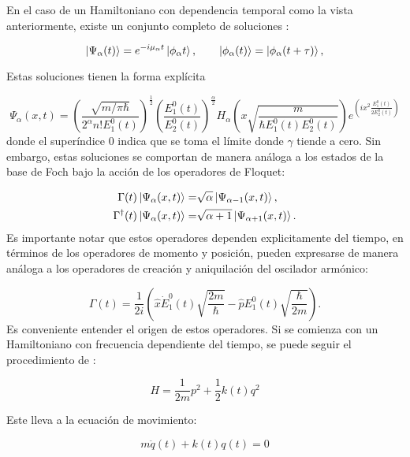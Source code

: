 \documentclass[a4paper,10pt]{report}
\begin{document}
En el caso de un Hamiltoniano con dependencia temporal como la vista anteriormente, existe un conjunto completo de soluciones \cite{BarnettSD}:

\begin{equation}
\Ket{\Psi_\alpha (t)} = e^{-i\mu_\alpha t}\Ket{\phi_\alpha t}, \qquad \Ket{\phi_\alpha (t)}=\Ket{\phi_\alpha (t+\tau)},
\end{equation}

Estas soluciones tienen la forma explícita\cite{BrownPT}

\begin{equation}
\Psi_\alpha (x,t) = (\frac{\sqrt{m/\pi\hbar}}{2^\alpha n!E_1^0(t)})^{\frac{1}{2}}(\frac{E_1^0(t)}{E_2^0(t)})^\frac{\alpha}{2}H_\alpha(x\sqrt{\frac{m}{\hbar E_1^0(t) E_2^0(t)}})e^{(ix^2\frac{E_1^0(t)}{2E_2^0(t)})}
\end{equation} donde el superíndice 0 indica que se toma el límite donde $\gamma$ tiende a cero. Sin embargo, estas soluciones se comportan de manera análoga a los estados de la base de Foch bajo la acción de los operadores de Floquet:

\begin{align*}\label{FloquetOperators}
\Gamma(t) \Ket{\Psi_\alpha (x,t)} =& \sqrt{\alpha}\Ket{\Psi_{\alpha-1} (x,t)}, \\
\Gamma^\dagger(t) \Ket{\Psi_\alpha (x,t)} =& \sqrt{\alpha+1}\Ket{\Psi_{\alpha+1} (x,t)}.
\end{align*}Es importante notar que estos operadores dependen explicitamente del tiempo, en términos de los operadores de momento y posición, pueden expresarse de manera análoga a los operadores de creación y aniquilación del oscilador armónico:

\begin{equation}
\Gamma(t) = \frac{1}{2i}(\hat{x}\dot{E}_1^0(t)\sqrt{\frac{2m}{\hbar}}-\hat{p}E_1^0(t)\sqrt{\frac{\hbar}{2m}}).
\end{equation}Es conveniente entender el origen de estos operadores. Si se comienza con un Hamiltoniano con frecuencia dependiente del tiempo, se puede seguir el procedimiento de \cite{BrownPT}:

\begin{equation}\label{TDHO}
H = \frac{1}{2m}p^2 + \frac{1}{2}k(t)q^2
\end{equation}

Este lleva a la ecuación de movimiento:

\begin{equation}
m\ddot{q}(t) + k(t)q(t) = 0
\end{equation}
\end{document}
